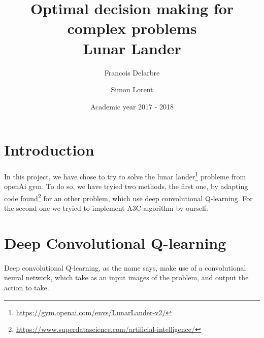 \documentclass[14pt,a4paper,oneside]{report}
\title{\textbf{Optimal decision making for complex problems}
\\ Lunar Lander}
\author{Francois Delarbre \and Simon Lorent}
\begin{document}
\vfill
\date{Academic year 2017 - 2018}

\maketitle

\section{Introduction}
\paragraph{} In this project, we have chose to try to solve the lunar lander\footnote{\url{https://gym.openai.com/envs/LunarLander-v2/}} probleme from openAi gym. To do so, we have tryied two methods, the first one, by adapting code found\footnote{\url{https://www.superdatascience.com/artificial-intelligence/}} for an other problem, which use deep convolutional Q-learning. For the second one we tryied to implement A3C algorithm by ourself. 

\section{Deep Convolutional Q-learning}
\paragraph{} Deep convolutional Q-learning, as the name says, make use of a convolutional neural network, which take as an input images of the problem, and output the action to take. 
\end{document}
